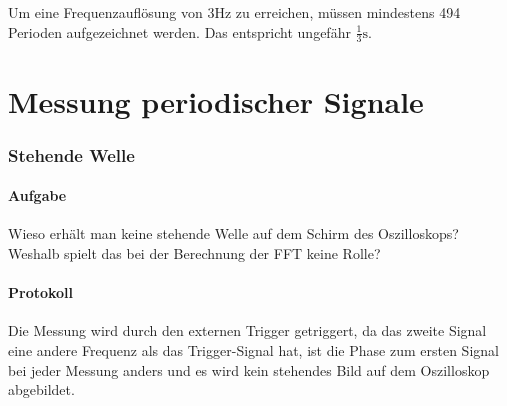 \documentclass[10pt]{scrreprt}
\begin{document}
        Um eine Frequenzauflösung von $3\si{\hertz}$ zu erreichen, müssen mindestens
        494 Perioden aufgezeichnet werden. Das entspricht ungefähr $\frac{1}{3} \si{\second}$.

        \section{Messung periodischer Signale}

        \subsubsection{Stehende Welle}
        \paragraph{Aufgabe}
        Wieso erhält man keine stehende Welle auf dem Schirm des Oszilloskops? Weshalb
        spielt das bei der Berechnung der FFT keine Rolle?
        \paragraph{Protokoll}
        Die Messung wird durch den externen Trigger getriggert, da das zweite Signal
        eine andere Frequenz als das Trigger-Signal hat, ist die Phase zum ersten Signal
        bei jeder Messung anders und es wird kein stehendes Bild auf dem Oszilloskop
        abgebildet.
\end{document}
